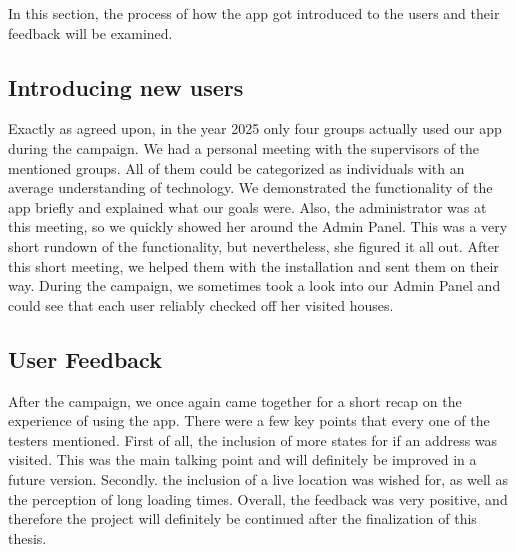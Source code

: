 \Author{\daAuthorTwo}

In this section, the process of how the app got introduced to the users and their feedback will be examined.

\blankLine

\subsection{Introducing new users}

Exactly as agreed upon, in the year 2025 only four groups actually used our app during the campaign. We had a personal meeting with the supervisors of the mentioned groups. All of them could be categorized as individuals with an average understanding of technology. We demonstrated the functionality of the app briefly and explained what our goals were. Also, the administrator was at this meeting, so we quickly showed her around the Admin Panel. This was a very short rundown of the functionality, but nevertheless, she figured it all out. After this short meeting, we helped them with the installation and sent them on their way. During the campaign, we sometimes took a look into our Admin Panel and could see that each user reliably checked off her visited houses.  

\subsection{User Feedback}

After the campaign, we once again came together for a short recap on the experience of using the app. There were a few key points that every one of the testers mentioned. First of all, the inclusion of more states for if an address was visited. This was the main talking point and will definitely be improved in a future version. Secondly. the inclusion of a live location was wished for, as well as the perception of long loading times. Overall, the feedback was very positive, and therefore the project will definitely be continued after the finalization of this thesis. 

\newpage